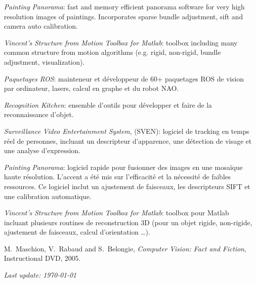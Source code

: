 \documentclass{article}
\begin{document}
\begin{llist}
{{\em Painting Panorama}: fast and memory efficient panorama software for very high resolution images of paintings.  Incorporates sparse bundle adjustment, sift and camera auto calibration.

{\em Vincent's Structure from Motion Toolbox for Matlab}: toolbox including many common structure from motion algorithms 
(e.g. rigid, non-rigid, bundle adjustment, visualization).
}
{
{\em Paquetages ROS}: mainteneur et d\'{e}veloppeur de 60+ paquetages ROS de vision par ordinateur, lasers, calcul
en graphe et du robot NAO.

{\em Recognition Kitchen}: ensemble d'outils pour d\'{e}velopper et faire de la reconnaissance d'objet.

{\em Surveillance Video Entertainment System}, (SVEN): logiciel de tracking en temps r\'eel de personnes, incluant un 
descripteur d'apparence, une d\'{e}tection de visage et une analyse d'expression.

{\em Painting Panorama}: logiciel rapide pour fusionner des images en une mosa\"{i}que haute r\'{e}solution.  L'accent 
a \'{e}t\'{e} mis sur l'efficacit\'{e} et la n\'{e}cessit\'{e} de faibles ressources.  Ce logiciel inclut un ajustement 
de faisceaux, les descripteurs SIFT et une calibration automatique.

{\em Vincent's Structure from Motion Toolbox for Matlab}: toolbox pour Matlab incluant plusieurs routines de 
reconstruction 3D (pour un objet rigide, non-rigide, ajustement de faisceaux, calcul d'orientation \dots).
}

{
}
{
}


{
}
{
}


M.~Maschion, V.~Rabaud and S.~Belongie, {\em Computer Vision: Fact and Fiction},
Instructional DVD, 2005.





\end{llist}

{\em Last update: \today}
\end{document}
